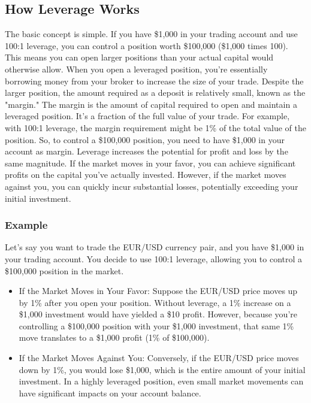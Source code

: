 \documentclass{report}
\begin{document}
     \subsection{How Leverage Works}
     The basic concept is simple. If you have \$1,000 in your trading account and use 100:1 leverage, you can control a position worth \$100,000 (\$1,000 times 100). This means you can open larger positions than your actual capital would otherwise allow.
     \bigbreak \noindent 
     When you open a leveraged position, you're essentially borrowing money from your broker to increase the size of your trade. Despite the larger position, the amount required as a deposit is relatively small, known as the "margin."
     \bigbreak \noindent 
     The margin is the amount of capital required to open and maintain a leveraged position. It's a fraction of the full value of your trade. For example, with 100:1 leverage, the margin requirement might be 1\% of the total value of the position. So, to control a \$100,000 position, you need to have \$1,000 in your account as margin.
     \bigbreak \noindent 
     Leverage increases the potential for profit and loss by the same magnitude. If the market moves in your favor, you can achieve significant profits on the capital you've actually invested. However, if the market moves against you, you can quickly incur substantial losses, potentially exceeding your initial investment.

     \bigbreak \noindent 
     \subsubsection{Example}
     \bigbreak \noindent 
     Let's say you want to trade the EUR/USD currency pair, and you have \$1,000 in your trading account. You decide to use 100:1 leverage, allowing you to control a \$100,000 position in the market.
     \begin{itemize}
         \item If the Market Moves in Your Favor: Suppose the EUR/USD price moves up by 1\% after you open your position. Without leverage, a 1\% increase on a \$1,000 investment would have yielded a \$10 profit. However, because you're controlling a \$100,000 position with your \$1,000 investment, that same 1\% move translates to a \$1,000 profit (1\% of \$100,000).
         \item If the Market Moves Against You: Conversely, if the EUR/USD price moves down by 1\%, you would lose \$1,000, which is the entire amount of your initial investment. In a highly leveraged position, even small market movements can have significant impacts on your account balance.
     \end{itemize}
\end{document}
